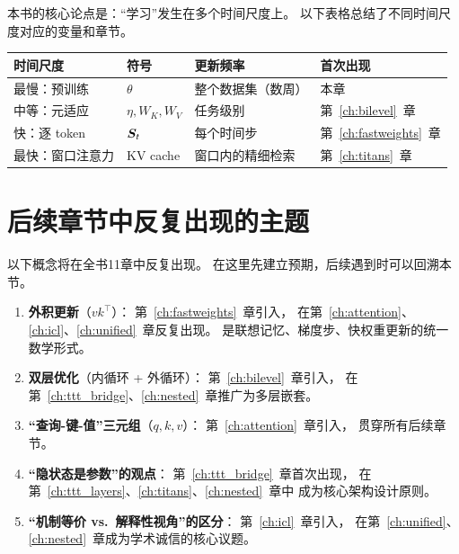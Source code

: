 本书的核心论点是：``学习''发生在多个时间尺度上。
以下表格总结了不同时间尺度对应的变量和章节。

\begin{center}
\begin{tabular}{p{2.5cm} p{2cm} p{3.5cm} p{4cm}}
\toprule
\textbf{时间尺度} & \textbf{符号} & \textbf{更新频率} & \textbf{首次出现} \\
\midrule
最慢：预训练
& $\theta$
& 整个数据集（数周）
& 本章 \\
中等：元适应
& $\eta, W_K, W_V$
& 任务级别
& 第~\ref{ch:bilevel}~章 \\
快：逐 token
& $\boldsymbol{S}_t$
& 每个时间步
& 第~\ref{ch:fastweights}~章 \\
最快：窗口注意力
& KV cache
& 窗口内的精细检索
& 第~\ref{ch:titans}~章 \\
\bottomrule
\end{tabular}
\end{center}

\section{后续章节中反复出现的主题}
\label{sec:intro_themes}

以下概念将在全书11章中反复出现。
在这里先建立预期，后续遇到时可以回溯本节。

\begin{enumerate}
  \item \textbf{外积更新}（$vk^\top$）：
    第~\ref{ch:fastweights}~章引入，
    在第~\ref{ch:attention}、\ref{ch:icl}、\ref{ch:unified}~章反复出现。
    是联想记忆、梯度步、快权重更新的统一数学形式。

  \item \textbf{双层优化}（内循环 + 外循环）：
    第~\ref{ch:bilevel}~章引入，
    在第~\ref{ch:ttt_bridge}、\ref{ch:nested}~章推广为多层嵌套。

  \item \textbf{``查询-键-值''三元组}（$q, k, v$）：
    第~\ref{ch:attention}~章引入，
    贯穿所有后续章节。

  \item \textbf{``隐状态是参数''的观点}：
    第~\ref{ch:ttt_bridge}~章首次出现，
    在第~\ref{ch:ttt_layers}、\ref{ch:titans}、\ref{ch:nested}~章中
    成为核心架构设计原则。

  \item \textbf{``机制等价 vs.\ 解释性视角''的区分}：
    第~\ref{ch:icl}~章引入，
    在第~\ref{ch:unified}、\ref{ch:nested}~章成为学术诚信的核心议题。
\end{enumerate}

